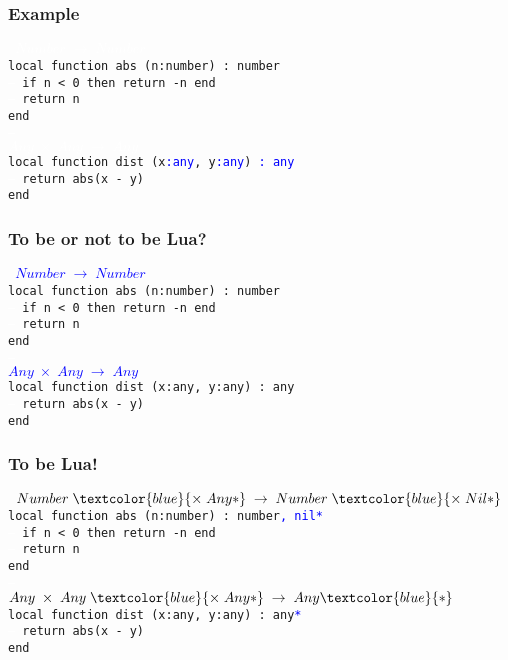 \documentclass{beamer}
\begin{document}
\begin{frame}
\frametitle{Example}
{\tt
\textcolor{white}{$Number \;\rightarrow\; Number$}\\
local function abs (n:number) : number\\
\textcolor{white}{--} if n < 0 then return -n end\\
\textcolor{white}{--} return n\\
end\\
\textcolor{white}{--}\\
\textcolor{white}{$Any \;\times\; Any \;\rightarrow\; Any$}\\
local function dist (x\textcolor{blue}{:any}, y\textcolor{blue}{:any}) \textcolor{blue}{: any}\\
\textcolor{white}{--} return abs(x - y)\\
end\\
}
\end{frame}

\begin{frame}
\frametitle{To be or not to be Lua?}
{\tt
\textcolor{blue}{$Number \;\rightarrow\; Number$}\\
local function abs (n:number) : number\\
\textcolor{white}{--} if n < 0 then return -n end\\
\textcolor{white}{--} return n\\
end\\
\textcolor{white}{--}\\
\textcolor{blue}{$Any \;\times\; Any \;\rightarrow\; Any$}\\
local function dist (x:any, y:any) : any\\
\textcolor{white}{--} return abs(x - y)\\
end\\
}
\end{frame}

\begin{frame}
\frametitle{To be Lua!}
{\tt
$Number \;\textcolor{blue}{\times\; {Any*}} \;\rightarrow\; Number \;\textcolor{blue}{\times\; {Nil*}}$\\
local function abs (n:number) : number\textcolor{blue}{, nil*}\\
\textcolor{white}{--} if n < 0 then return -n end\\
\textcolor{white}{--} return n\\
end\\
\textcolor{white}{--}\\
$Any \;\times\; Any \;\textcolor{blue}{\times\; {Any*}} \;\rightarrow\; {Any\textcolor{blue}{*}}$\\
local function dist (x:any, y:any) : any\textcolor{blue}{*}\\
\textcolor{white}{--} return abs(x - y)\\
end\\
}
\end{frame}
\end{document}
